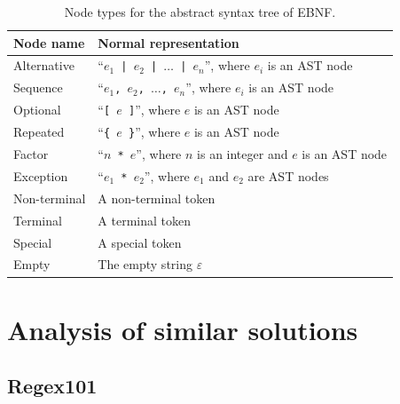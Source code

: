 \documentclass[english,bachelors,forcepolishlogotype]{wizthesis}
\begin{document}
\begin{longtable}[c]{@{}lm{9cm}@{}}
  \caption{Node types for the abstract syntax tree of EBNF.}
  \label{tab:ast-nodes}\\
  \toprule
  Node name           & Normal representation \\* \midrule
  \endfirsthead
  \endhead
  \endfoot
  \endlastfoot
  Alternative  & ``\texttt{$e_1$ | $e_2$ | $\dots$ | $e_n$}'', where $e_i$ is an AST node \\
  Sequence     & ``\texttt{$e_1$, $e_2$, $\dots$, $e_n$}'', where $e_i$ is an AST node \\
  Optional     & ``\texttt{[ $e$ ]}'', where $e$ is an AST node \\
  Repeated     & ``\texttt{\{ $e$ \}}'', where $e$ is an AST node \\
  Factor       & ``\texttt{$n$ * $e$}'', where $n$ is an integer and $e$ is an AST node \\
  Exception    & ``\texttt{$e_1$ * $e_2$}'', where $e_1$ and $e_2$ are AST nodes \\
  Non-terminal & A non-terminal token \\
  Terminal     & A terminal token \\
  Special      & A special token \\
  Empty        & The empty string $\varepsilon$ \\* \bottomrule
\end{longtable}

\chapter{Analysis of similar solutions} \label{ch:analysis-of-similar-solutions}

\section*{Regex101}
\end{document}
